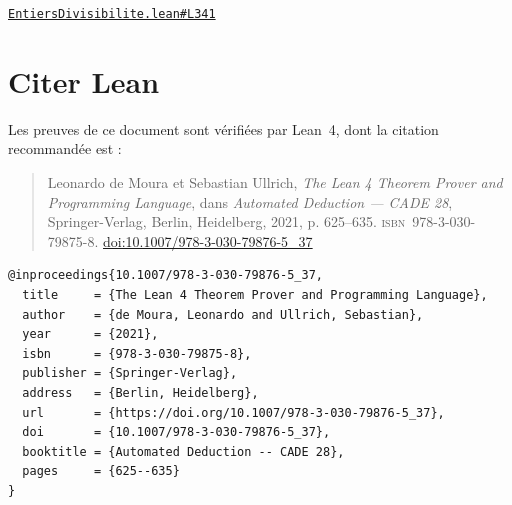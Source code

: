 \documentclass[11pt,a4paper]{article}
\theoremstyle{definition}
\theoremstyle{plain}
\newcommand{\source}[2]{\par\smallskip\noindent\hfill{\footnotesize\href{#1}{\texttt{#2}}}\par\smallskip}
\begin{document}
\source{https://github.com/Commutator-IO/learn-lean/blob/main/cours/01-college/07-enonces-conserves/EntiersDivisibilite.lean\#L341}{EntiersDivisibilite.lean\#L341}

\section*{Citer Lean}

Les preuves de ce document sont vérifiées par Lean~4, dont la citation recommandée est :

\begin{quote}
Leonardo de Moura et Sebastian Ullrich, \emph{The Lean 4 Theorem Prover and Programming
Language}, dans \emph{Automated Deduction — CADE 28}, Springer-Verlag, Berlin, Heidelberg,
2021, p. 625--635. \textsc{isbn}~978-3-030-79875-8.
\href{https://doi.org/10.1007/978-3-030-79876-5_37}{doi:10.1007/978-3-030-79876-5\_37}
\end{quote}

\begin{footnotesize}
\begin{verbatim}
@inproceedings{10.1007/978-3-030-79876-5_37,
  title     = {The Lean 4 Theorem Prover and Programming Language},
  author    = {de Moura, Leonardo and Ullrich, Sebastian},
  year      = {2021},
  isbn      = {978-3-030-79875-8},
  publisher = {Springer-Verlag},
  address   = {Berlin, Heidelberg},
  url       = {https://doi.org/10.1007/978-3-030-79876-5_37},
  doi       = {10.1007/978-3-030-79876-5_37},
  booktitle = {Automated Deduction -- CADE 28},
  pages     = {625--635}
}
\end{verbatim}
\end{footnotesize}
\end{document}
